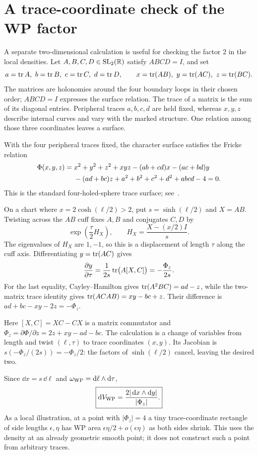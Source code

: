 \section{A trace-coordinate check of the WP factor}
\label{app:fricke}

A separate two-dimensional calculation is useful for checking the factor
$2$ in the local densities. Let $A,B,C,D\in\mathrm{SL}_2(\mathbb R)$ satisfy
$ABCD=I$, and set
\[
 a=\operatorname{tr} A,\ b=\operatorname{tr} B,\ c=\operatorname{tr} C,\ d=\operatorname{tr} D,
 \qquad x=\operatorname{tr}(AB),\ y=\operatorname{tr}(AC),\ z=\operatorname{tr}(BC).
\]
The matrices are holonomies around the four boundary loops in
their chosen order; $ABCD=I$ expresses the surface relation.
The trace of a matrix is the sum of its diagonal entries.
Peripheral traces $a,b,c,d$ are held fixed, whereas $x,y,z$
describe internal curves and vary with the marked structure.
One relation among those three coordinates leaves a surface.

With the four peripheral traces fixed, the character surface satisfies
the Fricke relation
\begin{align}
 \Phi(x,y,z)={}&x^2+y^2+z^2+xyz-(ab+cd)x-(ac+bd)y\notag\\
 &-(ad+bc)z+a^2+b^2+c^2+d^2+abcd-4=0.
 \label{eq:fricke}
\end{align}
This is the standard four-holed-sphere trace surface; see~\cite{Goldman}.

On a chart where $x=2\cosh(\ell/2)>2$, put $s=\sinh(\ell/2)$ and
$X=AB$. Twisting across the $AB$ cuff fixes $A,B$ and conjugates $C,D$ by
\[
 \exp\left(\frac{\tau}{2}H_X\right),
 \qquad H_X=\frac{X-(x/2)I}{s}.
\]
The eigenvalues of $H_X$ are $1,-1$, so this is a displacement of length
$\tau$ along the cuff axis. Differentiating $y=\operatorname{tr}(AC)$ gives
\[
 \frac{\partial y}{\partial\tau}
 =\frac1{2s}\operatorname{tr}\bigl(A[X,C]\bigr)
 =-\frac{\Phi_z}{2s}.
\]
For the last equality, Cayley--Hamilton gives
$\operatorname{tr}(A^2BC)=ad-z$, while the two-matrix trace identity gives
$\operatorname{tr}(ACAB)=xy-bc+z$. Their difference is
$ad+bc-xy-2z=-\Phi_z$.

Here $[X,C]=XC-CX$ is a matrix commutator and
$\Phi_z=\partial\Phi/\partial z=2z+xy-ad-bc$.
The calculation is a change of variables from length and twist
$(\ell,\tau)$ to trace coordinates $(x,y)$.
Its Jacobian is $s(-\Phi_z/(2s))=-\Phi_z/2$:
the factors of $\sinh(\ell/2)$ cancel, leaving the desired two.

Since $\dd x=s\,\dd\ell$ and $\omega_{\mathrm{WP}}=\mathop{}\!\mathrm d\ell\wedge\mathop{}\!\mathrm d\tau$,
\begin{equation}
 \boxed{\mathop{}\!\mathrm d V_{\mathrm{WP}}=\frac{2|\mathop{}\!\mathrm d x\wedge\mathop{}\!\mathrm d y|}{|\Phi_z|}.}
 \label{eq:frickedensity}
\end{equation}
As a local illustration, at a point with $|\Phi_z|=4$ a tiny
trace-coordinate rectangle of side lengths $\epsilon,\eta$
has WP area $\epsilon\eta/2+o(\epsilon\eta)$ as both sides
shrink. This uses the density at an already geometric smooth
point; it does not construct such a point from arbitrary traces.

